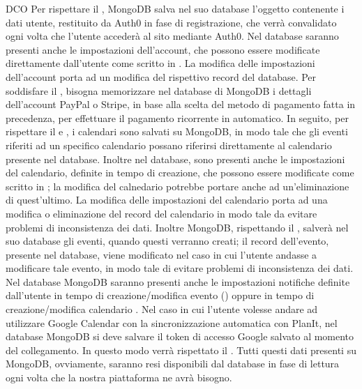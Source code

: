 \begin{listaPersonale}{DCO}
    Per rispettare il , MongoDB salva nel suo database l'oggetto contenente i dati utente, restituito da Auth0 in fase di registrazione, che verrà convalidato ogni volta che l'utente accederà al sito mediante Auth0. Nel database saranno presenti anche le impostazioni dell'account, che possono essere modificate direttamente dall'utente come scritto in .  La modifica delle impostazioni dell'account porta ad un modifica del rispettivo record del database. Per soddisfare il , bisogna memorizzare nel database di MongoDB i dettagli dell'account PayPal o Stripe, in base alla scelta del metodo di pagamento fatta in precedenza, per effettuare il pagamento ricorrente in automatico. In seguito, per rispettare il  e , i calendari sono salvati su MongoDB, in modo tale che gli eventi riferiti ad un specifico calendario possano riferirsi direttamente al calendario presente nel database. Inoltre nel database, sono presenti anche le impostazioni del calendario, definite in tempo di creazione, che possono essere modificate come scritto in ; la modifica del calnedario potrebbe portare anche ad un'eliminazione di quest'ultimo. La modifica delle impostazioni del calendario porta ad una modifica o eliminazione del record del calendario in modo tale da evitare problemi di inconsistenza dei dati. Inoltre MongoDB, rispettando il , salverà nel suo database gli eventi, quando questi verranno creati; il record dell'evento, presente nel database, viene modificato nel caso in cui l'utente andasse a modificare tale evento, in modo tale di evitare problemi di inconsistenza dei dati. Nel database MongoDB saranno presenti anche le impostazioni notifiche definite dall'utente in tempo di creazione/modifica evento () oppure in tempo di creazione/modifica calendario . Nel caso in cui l'utente volesse andare ad utilizzare Google Calendar con la sincronizzazione automatica con PlanIt, nel database MongoDB si deve salvare il token di accesso Google salvato al momento del collegamento. In questo modo verrà rispettato il . Tutti questi dati presenti su MongoDB, ovviamente, saranno resi disponibili dal database in fase di lettura ogni volta che la nostra piattaforma ne avrà bisogno.


\end{listaPersonale}
